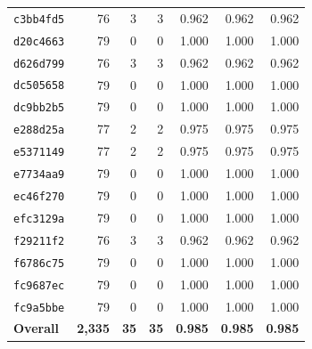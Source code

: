 \begin{table}[t]
\begin{tabular}{lrrrrrr}
\texttt{c3bb4fd5} & 76 & 3 & 3 & 0.962 & 0.962 & 0.962 \\
\texttt{d20c4663} & 79 & 0 & 0 & 1.000 & 1.000 & 1.000 \\
\texttt{d626d799} & 76 & 3 & 3 & 0.962 & 0.962 & 0.962 \\
\texttt{dc505658} & 79 & 0 & 0 & 1.000 & 1.000 & 1.000 \\
\texttt{dc9bb2b5} & 79 & 0 & 0 & 1.000 & 1.000 & 1.000 \\
\texttt{e288d25a} & 77 & 2 & 2 & 0.975 & 0.975 & 0.975 \\
\texttt{e5371149} & 77 & 2 & 2 & 0.975 & 0.975 & 0.975 \\
\texttt{e7734aa9} & 79 & 0 & 0 & 1.000 & 1.000 & 1.000 \\
\texttt{ec46f270} & 79 & 0 & 0 & 1.000 & 1.000 & 1.000 \\
\texttt{efc3129a} & 79 & 0 & 0 & 1.000 & 1.000 & 1.000 \\
\texttt{f29211f2} & 76 & 3 & 3 & 0.962 & 0.962 & 0.962 \\
\texttt{f6786c75} & 79 & 0 & 0 & 1.000 & 1.000 & 1.000 \\
\texttt{fc9687ec} & 79 & 0 & 0 & 1.000 & 1.000 & 1.000 \\
\texttt{fc9a5bbe} & 79 & 0 & 0 & 1.000 & 1.000 & 1.000 \\
\hline
\textbf{Overall} & \textbf{2{,}335} & \textbf{35} & \textbf{35} & \textbf{0.985} & \textbf{0.985} & \textbf{0.985} \\
\hline
\end{tabular}
\end{table}





